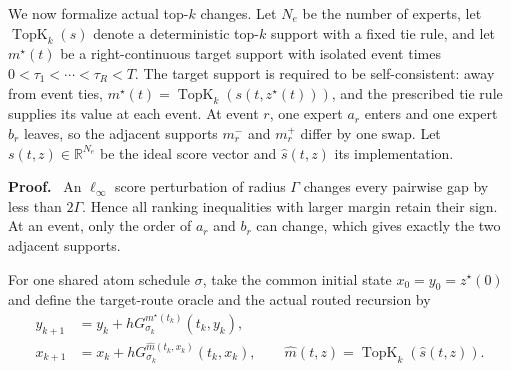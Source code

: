 \documentclass[twoside,11pt]{article}
\renewenvironment{proof}[1][Proof]{\par\noindent\textbf{#1.}\ }{\hfill\BlackBox\par\medskip}
\newcommand{\R}{\mathbb{R}}
\newcommand{\norm}[1]{\left\lVert #1\right\rVert}
\newcommand{\TopK}{\operatorname{TopK}}
\begin{document}
We now formalize actual top-$k$ changes.  Let $N_e$ be the number of experts,
let $\TopK_k(s)$ denote a deterministic top-$k$ support with a fixed tie rule,
and let $m^\star(t)$ be a right-continuous target support with isolated event
times $0<\tau_1<\cdots<\tau_R<T$.  The target support is required to be
self-consistent: away from event ties,
$m^\star(t)=\TopK_k(s(t,z^\star(t)))$, and the prescribed tie rule supplies
its value at each event.  At event $r$, one expert $a_r$ enters and
one expert $b_r$ leaves, so the adjacent supports $m_r^-$ and $m_r^+$ differ
by one swap.  Let $s(t,z)\in\R^{N_e}$ be the ideal score vector and
$\widehat s(t,z)$ its implementation.



\begin{proof}
An $\ell_\infty$ score perturbation of radius $\Gamma$ changes every pairwise
gap by less than $2\Gamma$.  Hence all ranking inequalities with larger
margin retain their sign.  At an event, only the order of $a_r$ and $b_r$ can
change, which gives exactly the two adjacent supports.
\end{proof}

For one shared atom schedule $\sigma$, take the common initial state
$x_0=y_0=z^\star(0)$ and define the target-route oracle and the actual routed
recursion by
\begin{align}
  y_{k+1}
  &=y_k+hG_{\sigma_k}^{m^\star(t_k)}(t_k,y_k),
  \label{eq:oracle-route-recursion-v2}\\
  x_{k+1}
  &=x_k+hG_{\sigma_k}^{\widehat m(t_k,x_k)}(t_k,x_k),
  \qquad
  \widehat m(t,z)=\TopK_k(\widehat s(t,z)).
  \label{eq:actual-route-recursion-v2}
\end{align}
\end{document}
